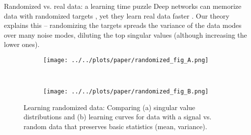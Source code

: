 \documentclass[final]{beamer}
\begin{document}
\begin{frame}[t]{}
\begin{columns}
\begin{column}[t]{0.248\textwidth}
\begin{block}{\large Randomized vs. real data: a learning time puzzle}
\vspace{-0.5em}
Deep networks can memorize data with randomized targets \citep{Zhang2016}, yet they learn real data faster \citep{Arpit2017}. Our theory explains this -- randomizing the targets spreads the variance of the data modes over many noise modes, diluting the top singular values (although increasing the lower ones).
\begin{figure}[H]
\centering
\begin{subfigure}[t]{0.5\textwidth}
\texttt{[image: ../../plots/paper/randomized\_fig\_A.png]}
\label{rand_fig_a}
\end{subfigure}~
\begin{subfigure}[t]{0.4\textwidth}
\texttt{[image: ../../plots/paper/randomized\_fig\_B.png]}
\label{rand_fig_b}
\end{subfigure}
\caption{Learning randomized data: Comparing (a) singular value distributions and (b) learning curves for data with a signal vs. random data that preserves basic statistics (mean, variance).}
\label{randomizing_fig}
\end{figure}
\vspace{-1em}
\end{block}
\end{column}





\end{columns}
\end{frame}
\end{document}
